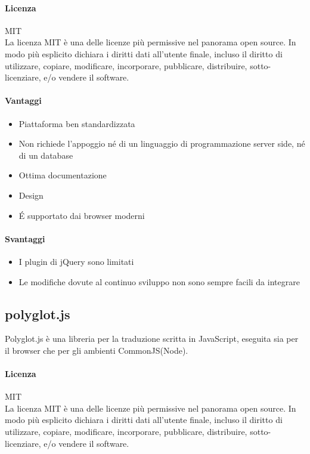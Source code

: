 \paragraph{Licenza} MIT \\
La licenza MIT è una delle licenze più permissive nel panorama open
source. In modo più esplicito dichiara i diritti dati all'utente
finale, incluso il diritto di utilizzare, copiare, modificare,
incorporare, pubblicare, distribuire, sotto-licenziare, e/o vendere il
software. 

\paragraph{Vantaggi}
\begin{itemize}
	
	\item Piattaforma ben standardizzata 
	\item Non richiede l’appoggio né di un linguaggio di programmazione server side, né di un database
	\item Ottima documentazione
	\item {} Design	
	\item \'E supportato dai browser moderni
	
\end{itemize}

\paragraph{Svantaggi} 
\begin{itemize}
	\item I plugin di jQuery sono limitati
	\item Le modifiche dovute al continuo sviluppo non sono sempre facili da integrare
\end{itemize}



\subsection{polyglot.js}
Polyglot.js è una libreria per la traduzione scritta in JavaScript, eseguita sia per il browser che per gli ambienti CommonJS(Node).

\paragraph{Licenza} MIT \\
La licenza MIT è una delle licenze più permissive nel panorama open
source. In modo più esplicito dichiara i diritti dati all'utente
finale, incluso il diritto di utilizzare, copiare, modificare,
incorporare, pubblicare, distribuire, sotto-licenziare, e/o vendere il
software. \\

